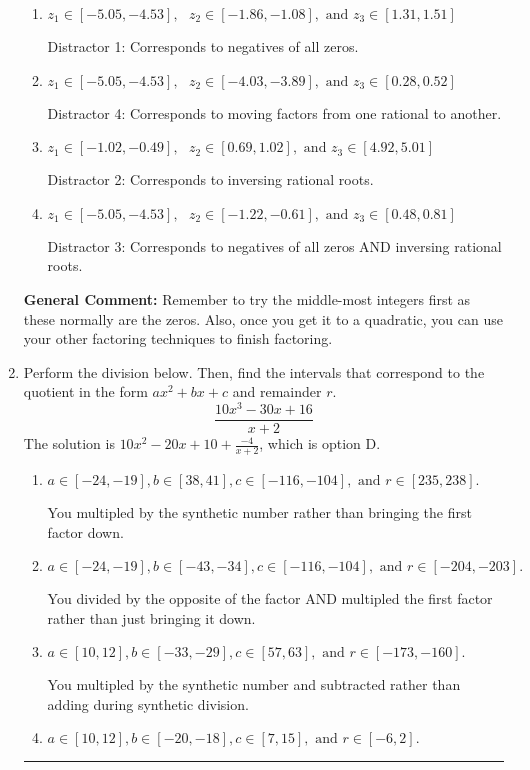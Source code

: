 \documentclass{extbook}[14pt]
\newcommand{\litem}[1]{\item #1

\rule{\textwidth}{0.4pt}}
\begin{document}
\begin{enumerate}
{\begin{enumerate}[label=\Alph*.]
* This is the solution!
\item \( z_1 \in [-5.05, -4.53], \text{   }  z_2 \in [-1.86, -1.08], \text{   and   } z_3 \in [1.31, 1.51] \)

 Distractor 1: Corresponds to negatives of all zeros.
\item \( z_1 \in [-5.05, -4.53], \text{   }  z_2 \in [-4.03, -3.89], \text{   and   } z_3 \in [0.28, 0.52] \)

 Distractor 4: Corresponds to moving factors from one rational to another.
\item \( z_1 \in [-1.02, -0.49], \text{   }  z_2 \in [0.69, 1.02], \text{   and   } z_3 \in [4.92, 5.01] \)

 Distractor 2: Corresponds to inversing rational roots.
\item \( z_1 \in [-5.05, -4.53], \text{   }  z_2 \in [-1.22, -0.61], \text{   and   } z_3 \in [0.48, 0.81] \)

 Distractor 3: Corresponds to negatives of all zeros AND inversing rational roots.
\end{enumerate}

\textbf{General Comment:} Remember to try the middle-most integers first as these normally are the zeros. Also, once you get it to a quadratic, you can use your other factoring techniques to finish factoring.
}
\litem{
Perform the division below. Then, find the intervals that correspond to the quotient in the form $ax^2+bx+c$ and remainder $r$.
\[ \frac{10x^{3} -30 x + 16}{x + 2} \]The solution is \( 10x^{2} -20 x + 10 + \frac{-4}{x + 2} \), which is option D.\begin{enumerate}[label=\Alph*.]
\item \( a \in [-24, -19], b \in [38, 41], c \in [-116, -104], \text{ and } r \in [235, 238]. \)

 You multipled by the synthetic number rather than bringing the first factor down.
\item \( a \in [-24, -19], b \in [-43, -34], c \in [-116, -104], \text{ and } r \in [-204, -203]. \)

 You divided by the opposite of the factor AND multipled the first factor rather than just bringing it down.
\item \( a \in [10, 12], b \in [-33, -29], c \in [57, 63], \text{ and } r \in [-173, -160]. \)

 You multipled by the synthetic number and subtracted rather than adding during synthetic division.
\item \( a \in [10, 12], b \in [-20, -18], c \in [7, 15], \text{ and } r \in [-6, 2]. \)


\end{enumerate}}
\end{enumerate}
\end{document}
